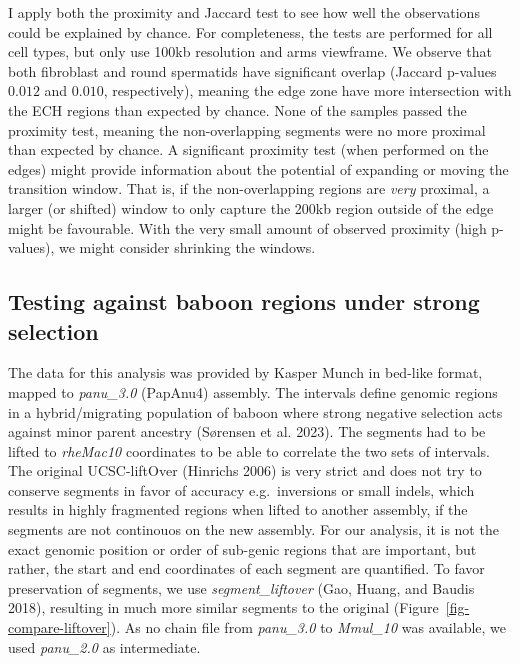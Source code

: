 \documentclass[
  11pt,
  a4paper,
]{scrbook}
\begin{document}
I apply both the proximity and Jaccard test to see how well the
observations could be explained by chance. For completeness, the tests
are performed for all cell types, but only use 100kb resolution and arms
viewframe. We observe that both fibroblast and round spermatids have
significant overlap (Jaccard p-values \(0.012\) and \(0.010\),
respectively), meaning the edge zone have more intersection with the ECH
regions than expected by chance. None of the samples passed the
proximity test, meaning the non-overlapping segments were no more
proximal than expected by chance. A significant proximity test (when
performed on the edges) might provide information about the potential of
expanding or moving the transition window. That is, if the
non-overlapping regions are \emph{very} proximal, a larger (or shifted)
window to only capture the 200kb region outside of the edge might be
favourable. With the very small amount of observed proximity (high
p-values), we might consider shrinking the windows.

\subsection{Testing against baboon regions under strong
selection}\label{testing-against-baboon-regions-under-strong-selection}

The data for this analysis was provided by Kasper Munch in bed-like
format, mapped to \emph{panu\_3.0} (PapAnu4) assembly. The intervals
define genomic regions in a hybrid/migrating population of baboon where
strong negative selection acts against minor parent ancestry (Sørensen
et al. 2023). The segments had to be lifted to \emph{rheMac10}
coordinates to be able to correlate the two sets of intervals. The
original UCSC-liftOver (Hinrichs 2006) is very strict and does not try
to conserve segments in favor of accuracy e.g.~inversions or small
indels, which results in highly fragmented regions when lifted to
another assembly, if the segments are not continouos on the new
assembly. For our analysis, it is not the exact genomic position or
order of sub-genic regions that are important, but rather, the start and
end coordinates of each segment are quantified. To favor preservation of
segments, we use \emph{segment\_liftover} (Gao, Huang, and Baudis 2018),
resulting in much more similar segments to the original
(Figure~\ref{fig-compare-liftover}). As no chain file from
\emph{panu\_3.0} to \emph{Mmul\_10} was available, we used
\emph{panu\_2.0} as intermediate.
\end{document}
